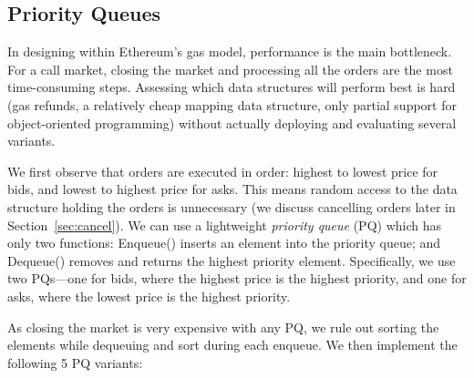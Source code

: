 

\subsection{Priority Queues}\label{sec:pq}

%

In designing \cm within Ethereum's gas model, performance is the main bottleneck. For a call market, closing the market and processing all the orders are the most time-consuming steps. Assessing which data structures will perform best is hard (\eg gas refunds, a relatively cheap mapping data structure, only partial support for object-oriented programming) without actually deploying and evaluating several variants.

We first observe that orders are executed in order: highest to lowest price for bids, and lowest to highest price for asks. This means random access to the data structure holding the orders is unnecessary (we discuss cancelling orders later in Section~\ref{sec:cancel}). We can use a lightweight \textit{priority queue} (PQ) which has only two functions: \textsf{Enqueue()} inserts an element into the priority queue; and \textsf{Dequeue()} removes and returns the highest priority element. Specifically, we use two PQs---one for bids, where the highest price is the highest priority, and one for asks, where the lowest price is the highest priority. 

As closing the market is very expensive with any PQ, we rule out sorting the elements while dequeuing and sort during each enqueue. We then implement the following 5 PQ variants: 





